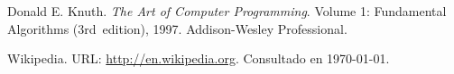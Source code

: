 \documentclass[a4paper,10pt,twocolumn]{article}
\theoremstyle{theorem}
\theoremstyle{definition}
\theoremstyle{remark}
\begin{document}
\begin{thebibliography}{99}
	 Donald E. Knuth. \emph{The Art of Computer Programming}.
		Volume 1: Fundamental Algorithms (3rd~edition), 1997.
		Addison-Wesley Professional.

	 Wikipedia. URL: \href{http://en.wikipedia.org}
	  {http://en.wikipedia.org}.
		Consultado en \today.
		
\end{thebibliography}

\label{end}
\end{document}
